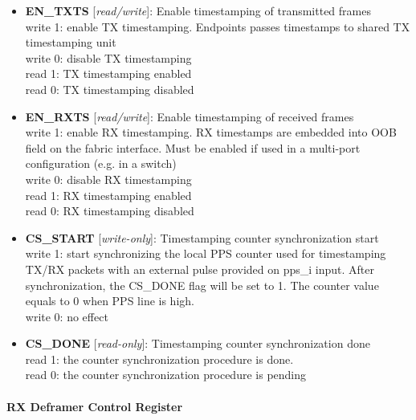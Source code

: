 \begin{itemize}
\item \begin{small}
{\bf 
EN\_TXTS
} [\emph{read/write}]: Enable timestamping of transmitted frames
\\
write 1: enable TX timestamping. Endpoints passes timestamps to shared TX timestamping unit\\				               write 0: disable TX timestamping \\                       read 1: TX timestamping enabled \\                       read 0: TX timestamping disabled
\end{small}
\item \begin{small}
{\bf 
EN\_RXTS
} [\emph{read/write}]: Enable timestamping of received frames
\\
write 1: enable RX timestamping. RX timestamps are embedded into OOB field on the fabric interface. Must be enabled if used in a multi-port configuration (e.g. in a switch)\\											  write 0: disable RX timestamping\\                        read 1: RX timestamping enabled\\                        read 0: RX timestamping disabled
\end{small}
\item \begin{small}
{\bf 
CS\_START
} [\emph{write-only}]: Timestamping counter synchronization start
\\
write 1: start synchronizing the local PPS counter used for timestamping TX/RX packets with an external pulse provided on pps\_i input. After synchronization, the CS\_DONE flag will be set to 1. The counter value equals to 0 when PPS line is high.\\				                write 0: no effect
\end{small}
\item \begin{small}
{\bf 
CS\_DONE
} [\emph{read-only}]: Timestamping counter synchronization done
\\
read 1: the counter synchronization procedure is done. \\				                read 0: the counter synchronization procedure is pending
\end{small}
\end{itemize}
\paragraph*{RX Deframer Control Register}\vspace{12pt}

